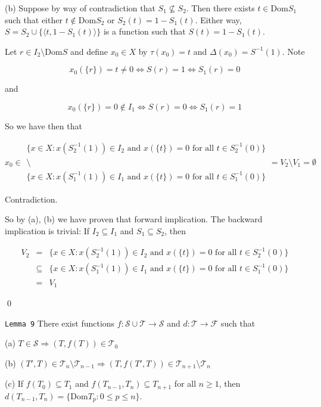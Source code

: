 \documentclass[12pt]{article}
\theoremstyle{plain}
\theoremstyle{definition}
\theoremstyle{remark}
\begin{document}
(b) Suppose by way of contradiction that $S_1 \not\subseteq S_2$. Then there exists $t \in \textrm{Dom} S_1$ such that either $t \not\in \textrm{Dom} S_2$ or $S_2(t) = 1-S_1(t)$.  Either way, $S= S_2 \cup \{\langle t,1-S_1(t) \rangle\}$ is a function such that $S(t)=1-S_1(t)$.

Let $r \in I_2 \setminus \textrm{Dom} S$ and define $x_0 \in X$ by $\tau(x_0) = t$ and $\Delta(x_0)=S^{-1}(1)$. Note

\[x_0(\{r\}) = t \not= 0 \Leftrightarrow S(r) = 1 \Leftrightarrow S_1(r)=0\]

and

\[x_0(\{r\}) = 0 \not\in I_1 \Leftrightarrow S(r) = 0 \Leftrightarrow S_1(r)=1\]

So we have then that 

\[
x_0 \in
\begin{array}{c}
\{ x\in X : x(S^{-1}_2(1)) \in I_2 \text{ and } x(\{t\})=0 \text{ for all } t \in S_2^{-1}(0)\}
\\
\setminus
\\
\{ x\in X : x(S^{-1}_1(1)) \in I_1 \text{ and } x(\{t\})=0 \text{ for all } t \in S_1^{-1}(0)\}
\end{array}
= V_2 \setminus V_1 = \emptyset
\]

Contradiction.

So by (a), (b) we have proven that forward implication.  The backward implication is trivial: If $I_2 \subseteq I_1$ and $S_1 \subseteq S_2$, then

\[
\begin{array}{rcl}
V_2
& = &
\{ x\in X : x(S^{-1}_2(1)) \in I_2 \text{ and } x(\{t\})=0 \text{ for all } t \in S_2^{-1}(0)\}
\\ & \subseteq &
\{ x\in X : x(S^{-1}_1(1)) \in I_1 \text{ and } x(\{t\})=0 \text{ for all } t \in S_1^{-1}(0)\}
\\ & = &
V_1
\end{array}
\]

\qed

\newpage

\texttt{Lemma 9} There exist functions $f:\mathcal{S}\cup\mathcal{T}\to\mathcal{S}$ and $d:\mathcal{T}\to\mathcal{F}$ such that

(a) $T \in \mathcal{S} \Rightarrow (T,f(T))\in \mathcal{T}_0$

(b) $(T',T)\in \mathcal{T}_n\setminus\mathcal{T}_{n-1} \Rightarrow (T,f(T',T))\in \mathcal{T}_{n+1}\setminus\mathcal{T}_n$

(c) If $f(T_0)\subseteq T_1$ and $f(T_{n-1},T_n) \subseteq T_{n+1}$ for all $n\geq 1$, then $d(T_{n-1},T_n) = \{\textrm{Dom}T_p: 0\leq p\leq n\}$.
\end{document}
